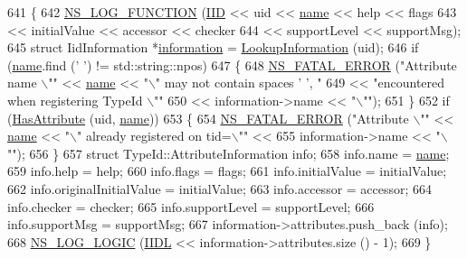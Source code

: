 \begin{DoxyCode}
641 \{
642   \hyperlink{log-macros-disabled_8h_a90b90d5bad1f39cb1b64923ea94c0761}{NS\_LOG\_FUNCTION} (\hyperlink{type-id_8cc_a88c5717498eac8c8d6a06538e6c65d49}{IID} << uid << \hyperlink{generate__test__data__lte__spectrum__model_8m_ab74e6bf80237ddc4109968cedc58c151}{name} << help << flags
643                    << initialValue << accessor << checker
644                    << supportLevel << supportMsg);
645   \textcolor{keyword}{struct }IidInformation *\hyperlink{doc_2readme_8txt_a56b8f954d58753a81bcf37ef0ad7ca0a}{information} = \hyperlink{classns3_1_1IidManager_a6b1f4ba2815dba27a377e8a8db2384cf}{LookupInformation} (uid);
646   \textcolor{keywordflow}{if} (\hyperlink{generate__test__data__lte__spectrum__model_8m_ab74e6bf80237ddc4109968cedc58c151}{name}.find (\textcolor{charliteral}{' '}) != std::string::npos)
647     \{
648       \hyperlink{group__fatal_ga5131d5e3f75d7d4cbfd706ac456fdc85}{NS\_FATAL\_ERROR} (\textcolor{stringliteral}{"Attribute name \(\backslash\)""} << \hyperlink{generate__test__data__lte__spectrum__model_8m_ab74e6bf80237ddc4109968cedc58c151}{name} << \textcolor{stringliteral}{"\(\backslash\)" may not contain spaces ' ', "}
649                       << \textcolor{stringliteral}{"encountered when registering TypeId \(\backslash\)""}
650                       << information->name << \textcolor{stringliteral}{"\(\backslash\)""});
651     \}
652   \textcolor{keywordflow}{if} (\hyperlink{classns3_1_1IidManager_aa6ce275dd09bdd19ea6eb3373b4ccc98}{HasAttribute} (uid, \hyperlink{generate__test__data__lte__spectrum__model_8m_ab74e6bf80237ddc4109968cedc58c151}{name}))
653     \{
654       \hyperlink{group__fatal_ga5131d5e3f75d7d4cbfd706ac456fdc85}{NS\_FATAL\_ERROR} (\textcolor{stringliteral}{"Attribute \(\backslash\)""} << \hyperlink{generate__test__data__lte__spectrum__model_8m_ab74e6bf80237ddc4109968cedc58c151}{name} << \textcolor{stringliteral}{"\(\backslash\)" already registered on tid=\(\backslash\)""} << 
655                       information->name << \textcolor{stringliteral}{"\(\backslash\)""});
656     \}
657   \textcolor{keyword}{struct }TypeId::AttributeInformation info;
658   info.name = \hyperlink{generate__test__data__lte__spectrum__model_8m_ab74e6bf80237ddc4109968cedc58c151}{name};
659   info.help = help;
660   info.flags = flags;
661   info.initialValue = initialValue;
662   info.originalInitialValue = initialValue;
663   info.accessor = accessor;
664   info.checker = checker;
665   info.supportLevel = supportLevel;
666   info.supportMsg = supportMsg;
667   information->attributes.push\_back (info);
668   \hyperlink{group__logging_ga88acd260151caf2db9c0fc84997f45ce}{NS\_LOG\_LOGIC} (\hyperlink{type-id_8cc_a3d266412e7a8a083ee1636faffe4ca8c}{IIDL} << information->attributes.size () - 1);
669 \}
\end{DoxyCode}


